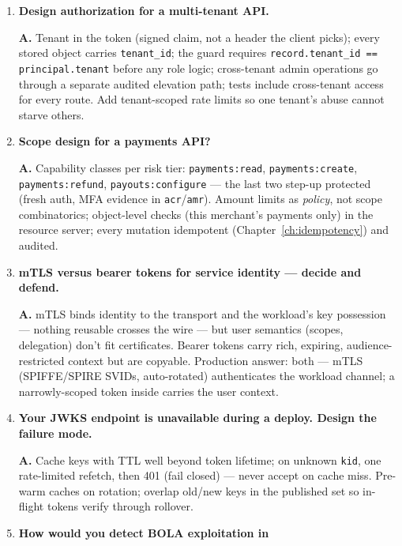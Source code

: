 \begin{enumerate}[label=\textbf{Q\arabic*.}, leftmargin=1.7cm, itemsep=0.9em, start=23]
  \item \textbf{Design authorization for a multi-tenant API.}\par
        \textbf{A.} Tenant in the token (signed claim, not a header the
        client picks); every stored object carries \texttt{tenant\_id};
        the guard requires \texttt{record.tenant\_id ==
        principal.tenant} before any role logic; cross-tenant admin
        operations go through a separate audited elevation path; tests
        include cross-tenant access for every route. Add
        tenant-scoped rate limits so one tenant's abuse cannot starve
        others.
  \item \textbf{Scope design for a payments API?}\par
        \textbf{A.} Capability classes per risk tier:
        \texttt{payments:read}, \texttt{payments:create},
        \texttt{payments:refund}, \texttt{payouts:configure} --- the last
        two step-up protected (fresh auth, MFA evidence in
        \texttt{acr}/\texttt{amr}). Amount limits as \emph{policy}, not
        scope combinatorics; object-level checks (this merchant's
        payments only) in the resource server; every mutation idempotent
        (Chapter~\ref{ch:idempotency}) and audited.
  \item \textbf{mTLS versus bearer tokens for service identity --- decide
        and defend.}\par
        \textbf{A.} mTLS binds identity to the transport and the
        workload's key possession --- nothing reusable crosses the wire ---
        but user semantics (scopes, delegation) don't fit certificates.
        Bearer tokens carry rich, expiring, audience-restricted context but
        are copyable. Production answer: both --- mTLS (SPIFFE/SPIRE
        SVIDs, auto-rotated) authenticates the workload channel; a
        narrowly-scoped token inside carries the user context.
  \item \textbf{Your JWKS endpoint is unavailable during a deploy. Design
        the failure mode.}\par
        \textbf{A.} Cache keys with TTL well beyond token lifetime; on
        unknown \texttt{kid}, one rate-limited refetch, then 401 (fail
        closed) --- never accept on cache miss. Pre-warm caches on
        rotation; overlap old/new keys in the published set so in-flight
        tokens verify through rollover.
  \item \textbf{How would you detect BOLA exploitation in
}
\end{enumerate}
